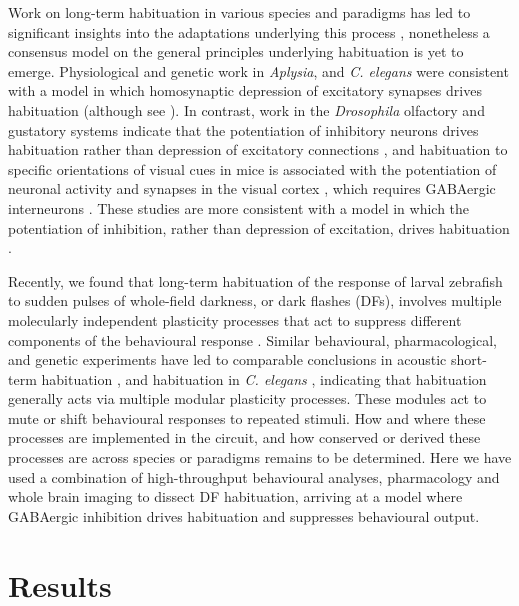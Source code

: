 \documentclass[9pt,lineno]{RandlettLab_elife}
\begin{document}
Work on long-term habituation in various species and paradigms has led to significant insights into the adaptations underlying this process \citep{Cooke2020-mz, McDiarmid2019-mh}, nonetheless a consensus model on the general principles underlying habituation is yet to emerge.  Physiological and genetic work in \emph{Aplysia}, and \emph{C. elegans} were consistent with a model in which homosynaptic depression of excitatory synapses drives habituation \citep{Bailey1983-ei, Rose2003-dl} (although see \citep{Glanzman2009-tz}). In contrast, work in the \emph{Drosophila} olfactory and gustatory systems indicate that the potentiation of inhibitory neurons drives habituation rather than depression of excitatory connections \citep{Das2011-gd, Paranjpe2012-ce, Trisal2022-pa},  and habituation to specific orientations of visual cues in mice is associated with the potentiation of neuronal activity and synapses in the visual cortex \citep{Cooke2015-qs}, which requires GABAergic interneurons \citep{Kaplan2016-qk, Hayden2021-ca}. These studies are more consistent with a model in which the potentiation of inhibition, rather than depression of excitation, drives habituation \citep{Cooke2020-mz}. 

Recently, we found that long-term habituation of the response of larval zebrafish to sudden pulses of whole-field darkness, or dark flashes (DFs), involves multiple molecularly independent plasticity processes that act to suppress different components of the behavioural response \citep{Randlett2019-fi}. Similar behavioural, pharmacological, and genetic experiments have led to comparable conclusions in acoustic short-term habituation \citep{Nelson2022-qr}, and habituation in \emph{C. elegans} \citep{McDiarmid2019-lo, McDiarmid2019-mh}, indicating that habituation generally acts via multiple modular plasticity processes. These modules act to mute or shift behavioural responses to repeated stimuli. How and where these processes are implemented in the circuit, and how conserved or derived these processes are across species or paradigms remains to be determined. Here we have used a combination of high-throughput behavioural analyses, pharmacology and whole brain imaging to dissect DF habituation, arriving at a model where GABAergic inhibition drives habituation and suppresses behavioural output.

\section{Results}
\end{document}

